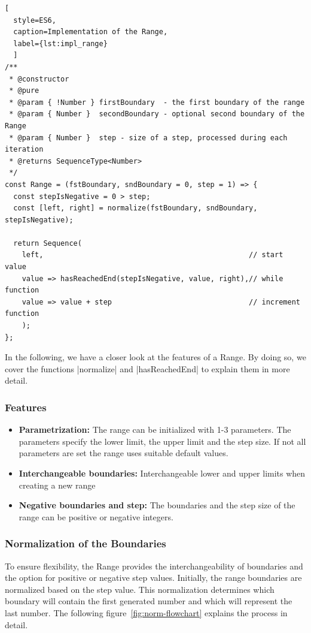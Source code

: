 \begin{lstlisting}[
  style=ES6, 
  caption=Implementation of the Range,
  label={lst:impl_range}
  ]
/**
 * @constructor
 * @pure
 * @param { !Number } firstBoundary  - the first boundary of the range
 * @param { Number }  secondBoundary - optional second boundary of the Range
 * @param { Number }  step - size of a step, processed during each iteration
 * @returns SequenceType<Number>
 */
const Range = (fstBoundary, sndBoundary = 0, step = 1) => {
  const stepIsNegative = 0 > step;
  const [left, right] = normalize(fstBoundary, sndBoundary, stepIsNegative);

  return Sequence(
    left,                                                // start value
    value => hasReachedEnd(stepIsNegative, value, right),// while function
    value => value + step                                // increment function
    );
};
\end{lstlisting}

In the following, we have a closer look at the features of a Range. By doing
so, we cover the functions |normalize| and |hasReachedEnd| to explain them 
in more detail.

\subsubsection{Features}
\label{subsub:Features}

\begin{itemize}
  \item{\textbf{Parametrization:} The range can be initialized with 1-3 parameters. The parameters specify the lower limit, the upper limit and the
  step size. If not all parameters are set the range uses suitable default values.}
  \item{\textbf{Interchangeable boundaries:} Interchangeable lower and upper limits when creating a new range}
  \item{\textbf{Negative boundaries and step:} The boundaries and the step size of the range can be positive or negative integers.}
\end{itemize}


\subsubsection{Normalization of the Boundaries}
\label{subsub:Normalization of the Boundaries}
To ensure flexibility, the Range provides the interchangeability of boundaries
and the option for positive or negative step values. Initially, the range
boundaries are normalized based on the step value. This normalization
determines which boundary will contain the first generated number and which
will represent the last number.
The following figure~\ref{fig:norm-flowchart} explains the process in detail.

